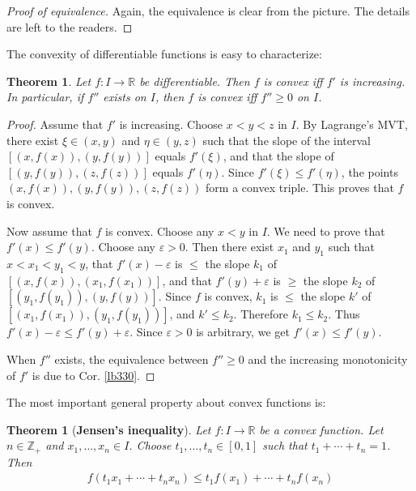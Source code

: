 \documentclass[12pt,b5paper,notitlepage]{article}
\theoremstyle{definition}
\theoremstyle{plain}
\newtheorem{thm}[df]{Theorem}
\newcommand{\Zbb}{\mathbb Z}
\newcommand{\Rbb}{\mathbb R}
\newcommand{\eps}{\varepsilon}
\numberwithin{equation}{section}
\begin{document}
\begin{proof}[Proof of equivalence]
Again, the equivalence is clear from the picture. The details are left to the readers.
\end{proof}



The convexity of differentiable functions is easy to characterize:

\begin{thm}\label{lb366}
Let $f:I\rightarrow\Rbb$ be differentiable. Then $f$ is convex iff $f'$ is increasing. In particular, if $f''$ exists on $I$, then $f$ is convex iff $f''\geq0$ on $I$.
\end{thm}

\begin{proof}
Assume that $f'$ is increasing. Choose $x<y<z$ in $I$. By Lagrange's MVT, there exist $\xi\in(x,y)$ and $\eta\in(y,z)$ such that the slope of the interval $[(x,f(x)),(y,f(y))]$ equals $f'(\xi)$, and that the slope of $[(y,f(y)),(z,f(z))]$ equals $f'(\eta)$. Since $f'(\xi)\leq f'(\eta)$, the points $(x,f(x)),(y,f(y)),(z,f(z))$ form a convex triple. This proves that $f$ is convex.

Now assume that $f$ is convex. Choose any $x<y$ in $I$. We need to prove that $f'(x)\leq f'(y)$. Choose any $\eps>0$. Then there exist $x_1$ and $y_1$ such that $x<x_1<y_1<y$, that $f'(x)-\eps$ is $\leq$ the slope $k_1$ of $[(x,f(x)),(x_1,f(x_1))]$, and that $f'(y)+\eps$ is $\geq$ the slope $k_2$ of $[(y_1,f(y_1)),(y,f(y))]$. Since $f$ is convex, $k_1$ is $\leq$ the slope $k'$ of $[(x_1,f(x_1)),(y_1,f(y_1))]$, and $k'\leq k_2$. Therefore $k_1\leq k_2$. Thus $f'(x)-\eps\leq f'(y)+\eps$. Since $\eps>0$ is arbitrary, we get $f'(x)\leq f'(y)$.

When $f''$ exists, the equivalence between $f''\geq0$ and the increasing monotonicity of $f'$ is due to Cor. \ref{lb330}.
\end{proof}











The most important general property about convex functions is:

\begin{thm}[\textbf{Jensen's inequality}]  
Let $f:I\rightarrow\Rbb$ be a convex function. Let $n\in\Zbb_+$ and $x_1,\dots,x_n\in I$. Choose $t_1,\dots,t_n\in[0,1]$ such that $t_1+\cdots+t_n=1$. Then
\begin{align}
f(t_1x_1+\cdots+t_nx_n)\leq t_1f(x_1)+\cdots+t_nf(x_n)
\end{align}
\end{thm}
\end{document}
